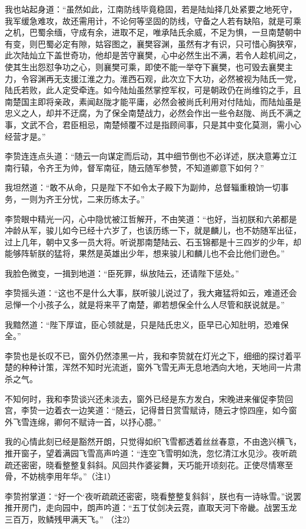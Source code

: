 我也站起身道：“虽然如此，江南防线毕竟稳固，若是陆灿择几处紧要之地死守，我军缓急难攻，故还需用计，不论何等坚固的防线，守备之人若有缺陷，就是可乘之机，巴蜀余缅，守成有余，进取不足，唯承陆氏余威，不足为惧，一旦南楚朝中有变，则巴蜀必定有隙，姑容图之，襄樊容渊，虽然有才有识，只可惜心胸狭窄，此次陆灿立下盖世奇功，他却是苦守襄樊，心中必然生出不满，若令人趁机间之，使其生出怨怼争功之心，则襄樊可乘，即使不能一举夺下襄樊，也可毁去襄樊主力，令容渊再无支援江淮之力。淮西石观，此次立下大功，必然被视为陆氏一党，陆氏若败，此人定受牵连。如今陆灿虽然掌控军权，可是朝政仍在尚维钧之手，且南楚国主即将亲政，素闻赵陇才能平庸，必然会被尚氏利用对付陆灿，而陆灿虽是忠义之人，却并不迂腐，为了保全南楚战力，必然会作出一些令赵陇、尚氏不满之事，文武不合，君臣相忌，南楚倾覆不过是指顾间事，只是其中变化莫测，需小心经营才是。”

李贽连连点头道：“随云一向谋定而后动，其中细节倒也不必详述，朕决意筹立江南行辕，令齐王为帅，督军南征，随云随军参赞，不知道卿意下如何？”

我坦然道：“敢不从命，只是陛下不如令太子殿下为副帅，总督辎重粮饷一切事务，一则为齐王分忧，二来历练太子。”

李贽眼中精光一闪，心中隐忧被江哲解开，不由笑道：“也好，当初朕和六弟都是冲龄从军，骏儿如今已经十六岁了，也该历练一下，就是麟儿，也不妨随军出征，过上几年，朝中又多一员大将。听说那南楚陆云、石玉锦都是十三四岁的少年，却能够阵斩朕的猛将，果然是英雄出少年，想来骏儿和麟儿也不会比他们逊色。”

我脸色微变，一揖到地道：“臣死罪，纵放陆云，还请陛下惩处。”

李贽摇头道：“这也不是什么大事，朕听骏儿说过了，我大雍猛将如云，难道还会忌惮一个小孩子么，就是将来平了南楚，卿若想保全什么人尽管和朕说就是。”

我黯然道：“陛下厚谊，臣心领就是，只是陆氏忠义，臣早已心知肚明，恐难保全。”

李贽也是长叹不已，窗外仍然漆黑一片，我和李贽就在灯光之下，细细的探讨着平楚的种种计策，浑然不知时光流逝，窗外飞雪无声无息地洒向大地，天地间一片肃杀之气。

不知何时，我和李贽谈兴还未淡去，窗外已经是东方发白，宋晚进来催促李贽回宫，李贽一边着衣一边笑道：“随云，记得昔日赏雪赋诗，随云才惊四座，如今窗外飞雪连绵，卿何不赋诗一首，以抒心臆。”

我的心情此刻已经是豁然开朗，只觉得如织飞雪都透着丝丝春意，不由逸兴横飞，推开窗子，望着满园飞雪高声吟道：“连空飞雪明如洗，忽忆清江水见沙。夜听疏疏还密密，晓看整整复斜斜。风回共作婆娑舞，天巧能开顷刻花。正使尽情寒至骨，不妨桃李用年华。”（注1）

李贽拊掌道：“好一个‘夜听疏疏还密密，晓看整整复斜斜’，朕也有一诗咏雪。”说罢推开房门，走向园中，朗声吟道：“五丁仗剑决云霓，直取天河下帝畿。战罢玉龙三百万，败鳞残甲满天飞。” （注2）

